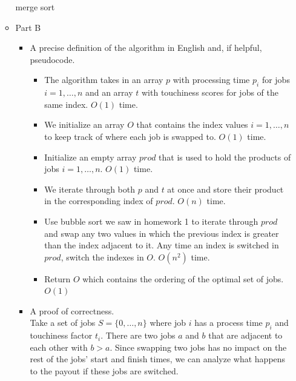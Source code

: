 \documentclass[letterpaper,11pt]{article}
\begin{document}
\begin{enumerate}
\begin{itemize}
          \color{red} merge sort \color{teal}
  \item Part B
      \begin{itemize}
          \item A precise definition of the algorithm in English and, if helpful, pseudocode.

              \begin{itemize}
                  \item The algorithm takes in an array $p$ with processing time
                      $p_i$ for jobs $i = 1, \ldots, n$ and an array $t$ with 
                      touchiness scores for jobs of the same index. 
                      $O\left( 1 \right) $ time.
                  \item We initialize an array $O$ that contains the index values
                      $i = 1, \ldots, n$ to keep track of where each job is 
                      swapped to. $O\left( 1 \right) $ time.
                  \item Initialize an empty array $prod$ that is used to hold
                      the products of jobs $i = 1, \ldots, n$. $O\left( 1 \right) $
                      time.
                  \item We iterate through both $p$ and $t$ at once and store 
                      their product in the corresponding index of $prod$.
                      $O\left( n \right) $ time.
                  \item Use bubble sort we saw in homework 1 to iterate through
                      $prod$ and swap any two values in which the previous 
                      index is greater than the index adjacent to it. Any time 
                      an index is switched in $prod$, switch the indexes in  $O$.
                      $O\left( n^2 \right) $ time.
                  \item Return $O$ which contains the ordering of the optimal 
                      set of jobs. $O\left( 1 \right) $
              \end{itemize}

          \item A proof of correctness. \\

              Take a set of jobs $S = \{0, \ldots, n\} $ where job $i$ has a
              process time $p_i$ and touchiness factor $t_i$. There are two jobs
              $a$ and $b$ that are adjacent to each other with $b > a$. Since 
              swapping two jobs has no impact on the rest of the jobs' start 
              and finish times, we can analyze what happens to the payout 
              if these jobs are switched. \\



\end{itemize}
\end{itemize}
\end{enumerate}
\end{document}
